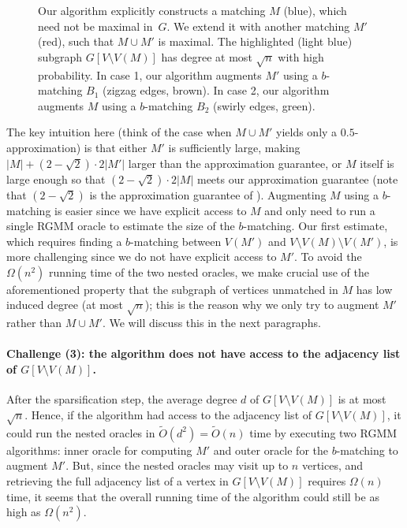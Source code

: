 \documentclass[letterpaper,11pt]{article}
\newcommand{\wt}[1]{\ensuremath{\widetilde{#1}}}
\begin{document}
\begin{figure}[t]
\vspace{-2em}
\caption{Our algorithm explicitly constructs a matching $M$ (blue), which need not be maximal in~$G$.
We extend it with another matching $M'$ (red), such that $M \cup M'$ is maximal.
The highlighted (light blue) subgraph $G[V \setminus V(M)]$ has degree at most $\sqrt{n}$ with high probability.
In case 1, our algorithm augments $M'$ using a $b$-matching $B_1$ (zigzag edges, brown).
In case 2, our algorithm augments $M$ using a $b$-matching $B_2$ (swirly edges, green).}
    \label{fig1}
\end{figure}

The key intuition here (think of the case when $M \cup M'$ yields only a $0.5$-approximation) is that either $M'$ is sufficiently large, making $|M| + (2-\sqrt{2})\cdot 2|M'|$ larger than the approximation guarantee, or $M$ itself is large enough so that $(2-\sqrt{2})\cdot 2|M|$ meets our approximation guarantee (note that $(2-\sqrt{2})$ is the approximation guarantee of \cite{KonradN21}). Augmenting $M$ using a $b$-matching is easier since we have explicit access to $M$ and only need to run a single RGMM oracle to estimate the size of the $b$-matching. Our first estimate, which requires finding a $b$-matching between $V(M')$ and $V \setminus V(M) \setminus V(M')$, is more challenging since we do not have explicit access to $M'$.
To avoid the $\Omega(n^2)$ running time of the two nested oracles, we make crucial use of the aforementioned property that the subgraph of vertices unmatched in $M$ has low induced degree (at most $\sqrt{n}$);
this is the reason why we only try to augment $M'$ rather than $M \cup M'$.
We will discuss this in the next  paragraphs.  


\paragraph{Challenge (3): the algorithm does not have access to the adjacency list of $G[V \setminus V(M)]$.} After the sparsification step, the average degree $d$ of $G[V \setminus V(M)]$ is at most $\sqrt{n}$. Hence, if the algorithm had access to the adjacency list of $G[V \setminus V(M)]$, it could run the nested oracles in $\wt{O}(d^2) = \wt{O}(n)$ time by executing two RGMM algorithms: inner oracle for computing $M'$ and outer oracle for the $b$-matching to augment $M'$. But, since the nested oracles may visit up to $n$ vertices, and retrieving the full adjacency list of a vertex in $G[V \setminus V(M)]$ requires $\Omega(n)$ time, it seems that the overall running time of the algorithm could still be as high as $\Omega(n^2)$.  
\end{document}
